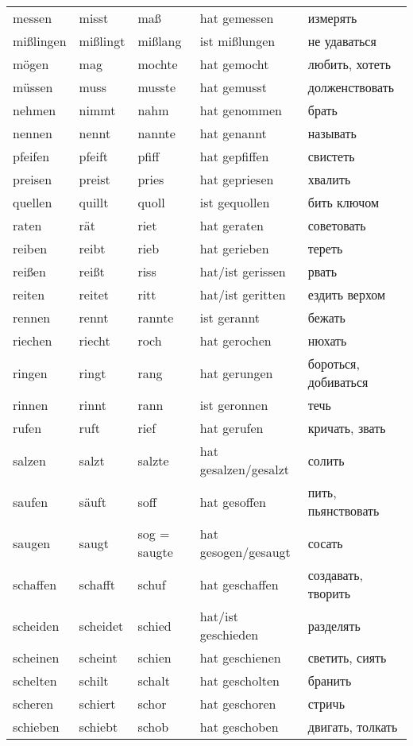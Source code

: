 \begin{longtable}{|l|l|l|l|l|}
messen & misst & ma\ss  & hat gemessen & измерять \\
mi\ss lingen & mi\ss lingt & mi\ss lang & ist mi\ss lungen & не удаваться \\
m\"ogen & mag & mochte & hat gemocht & любить, хотеть \\
m\"ussen & muss & musste & hat gemusst & долженствовать \\
nehmen & nimmt & nahm & hat genommen & брать \\
nennen & nennt & nannte & hat genannt & называть \\
pfeifen & pfeift & pfiff & hat gepfiffen & свистеть \\
preisen & preist & pries & hat gepriesen & хвалить \\
quellen & quillt & quoll & ist gequollen & бить ключом \\
raten & r\"at & riet & hat geraten & советовать \\
reiben & reibt & rieb & hat gerieben & тереть \\
rei\ss en & rei\ss t & riss & hat/ist gerissen & рвать \\
reiten & reitet & ritt & hat/ist geritten & ездить верхом \\
rennen & rennt & rannte & ist gerannt & бежать \\
riechen & riecht & roch & hat gerochen & нюхать \\
ringen & ringt & rang & hat gerungen & бороться, добиваться \\
rinnen & rinnt & rann & ist geronnen & течь \\
rufen & ruft & rief & hat gerufen & кричать, звать \\
salzen & salzt & salzte & hat gesalzen/gesalzt & солить \\
saufen & s\"auft & soff & hat gesoffen & пить, пьянствовать \\
saugen & saugt & sog = saugte & hat gesogen/gesaugt & сосать \\
schaffen & schafft & schuf & hat geschaffen & создавать, творить \\
scheiden & scheidet & schied & hat/ist geschieden & разделять \\
scheinen & scheint & schien & hat geschienen & светить, сиять \\
schelten & schilt & schalt & hat gescholten & бранить \\
scheren & schiert & schor & hat geschoren & стричь \\
schieben & schiebt & schob & hat geschoben & двигать, толкать \\

\end{longtable}
